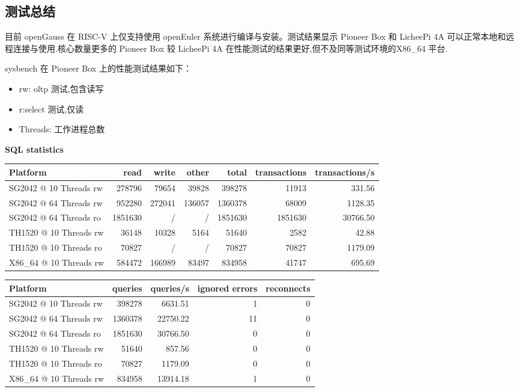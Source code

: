 \documentclass{article}
\begin{document}
\subsection{测试总结}
目前 openGauss 在 RISC-V 上仅支持使用 openEuler 系统进行编译与安装。测试结果显示 Pioneer Box 和 LicheePi 4A 可以正常本地和远程连接与使用.核心数量更多的 Pioneer Box 较 LicheePi 4A 在性能测试的结果更好,但不及同等测试环境的X86\_64 平台.

sysbench 在 Pioneer Box 上的性能测试结果如下：

\begin{itemize}
    \item rw: oltp 测试,包含读写 
    \item r:select 测试,仅读
    \item Threads: 工作进程总数
\end{itemize}

\textbf{SQL statistics}

\begin{table}[H]
\centering
\begin{tabular}{|l|r|r|r|r|r|r|}
\hline
Platform & read & write & other & total & transactions & transactions/s \\
\hline
SG2042 @ 10 Threads rw & 278796 & 79654 & 39828 & 398278 & 11913 & 331.56 \\
SG2042 @ 64 Threads rw & 952280 & 272041 & 136057 & 1360378 & 68009 & 1128.35 \\
SG2042 @ 64 Threads ro & 1851630 & / & / & 1851630 & 1851630 & 30766.50 \\
TH1520 @ 10 Threads rw & 36148 & 10328 & 5164 & 51640 & 2582 & 42.88 \\
TH1520 @ 10 Threads ro & 70827 & / & / & 70827 & 70827 & 1179.09 \\
X86\_64 @ 10 Threads rw & 584472 & 166989 & 83497 & 834958 & 41747 & 695.69 \\
\hline
\end{tabular}
\end{table}

\begin{table}[H]
\centering
\begin{tabular}{|l|r|r|r|r|}
\hline
Platform & queries & queries/s & ignored errors & reconnects \\
\hline
SG2042 @ 10 Threads rw & 398278 & 6631.51 & 1 & 0 \\
SG2042 @ 64 Threads rw & 1360378 & 22750.22 & 11 & 0 \\
SG2042 @ 64 Threads ro & 1851630 & 30766.50 & 0 & 0 \\
TH1520 @ 10 Threads rw & 51640 & 857.56 & 0 & 0 \\
TH1520 @ 10 Threads ro & 70827 & 1179.09 & 0 & 0 \\
X86\_64 @ 10 Threads rw & 834958 & 13914.18 & 1 & 0 \\
\hline
\end{tabular}
\end{table}
\end{document}
